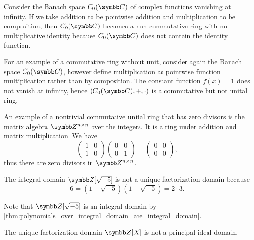 \begin{example}
\begin{description}
     Consider the Banach space \( C_0(\Co) \) of complex functions vanishing at infinity. If we take addition to be pointwise addition and multiplication to be composition, then \( C_0(\Co) \) becomes a non-commutative ring with no multiplicative identity because \( C_0(\Co) \) does not contain the identity function.

     For an example of a commutative ring without unit, consider again the Banach space \( C_0(\Co) \), however define multiplication as pointwise function multiplication rather than by composition. The constant function \( f(x) = 1 \) does not vanish at infinity, hence \( (C_0(\Co), +, \cdot) \) is a commutative but not unital ring.

     An example of a nontrivial commutative unital ring that has zero divisors is the matrix algebra \( \Z^{n \times n} \) over the integers. It is a ring under addition and matrix multiplication. We have
    \begin{equation*}
      \begin{pmatrix}
        1 & 0 \\
        1 & 0
      \end{pmatrix}
      \begin{pmatrix}
        0 & 0 \\
        0 & 1
      \end{pmatrix}
      =
      \begin{pmatrix}
        0 & 0 \\
        0 & 0
      \end{pmatrix},
    \end{equation*}
    thus there are zero divisors in \( \Z^{n \times n} \).

    \cite[388]{Knapp2016BAlg} The integral domain \( \Z[\sqrt{-5}] \) is not a unique factorization domain because
    \begin{equation*}
      6 = (1 + \sqrt{-5}) (1 - \sqrt{-5}) = 2 \cdot 3.
    \end{equation*}

    Note that \( \Z[\sqrt{-5}] \) is an integral domain by \cref{thm:polynomials_over_integral_domain_are_integral_domain}.

    \cite{ProofWiki:polynomials_in_integers_is_not_principal_ideal_domain} The unique factorization domain \( \Z[X] \) is not a principal ideal domain.


\end{description}
\end{example}

